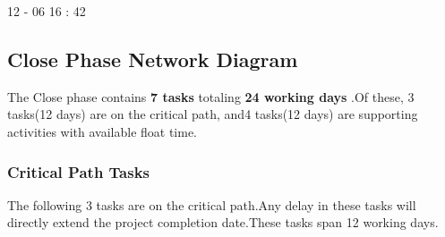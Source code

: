    12 -
    06 16 : 42 %

\subsection{Close Phase Network Diagram}

                 The Close phase contains \textbf{7 tasks} totaling \textbf{
                     24 working days}
                     .Of these,
    3 tasks(12 days) are on the critical path,
    and4 tasks(12 days) are supporting activities with available float time.

\vspace {
  0.5em
}

\subsubsection { Critical Path Tasks }

\noindent The following 3 tasks are on the critical
    path.Any delay in these tasks will directly extend the project completion
        date.These tasks span 12 working days.

\vspace {
  0.5em
}

